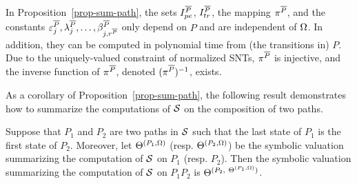 In Proposition~\ref{prop-sum-path}, the sets $I^{\overline{P}}_{pe}$, $I^{\overline{P}}_{tr}$, the mapping $\pi^{\overline{P}}$, and the constants $\varepsilon^{\overline{P}}_j,\lambda^{\overline{P}}_j, \dots, \beta^{\overline{P}}_{j,r^{\overline{P}}}$ only depend on $P$ and are independent of $\Omega$. In addition, they can be computed in polynomial time from (the transitions in) $P$.
Due to the uniquely-valued constraint of normalized SNTs, $\pi^{\overline{P}}$ is injective, and the inverse function of $\pi^{\overline{P}}$, denoted $(\pi^{\overline{P}})^{-1}$, exists.  

As a corollary of Proposition~\ref{prop-sum-path}, the following result demonstrates how to summarize the computations of ${\mathcal{S} }$ on the composition of two paths.

\begin{corollary}\label{cor-comp-two-paths}
Suppose that $P_1$ and $P_2$ are two paths in ${\mathcal{S} }$ such that the last state of $P_1$ is the first state of $P_2$. Moreover, let $\Theta^{(P_1, \Omega)}$ (resp. $\Theta^{(P_2, \Omega)}$) be the symbolic valuation summarizing the computation of ${\mathcal{S} }$ on $P_1$ (resp. $P_2$). Then the symbolic valuation summarizing the computation of ${\mathcal{S} }$ on $P_1 P_2$ is $\sumf^{(P_2,\ \sumf^{(P_1,\initval)})}$.
\end{corollary}

